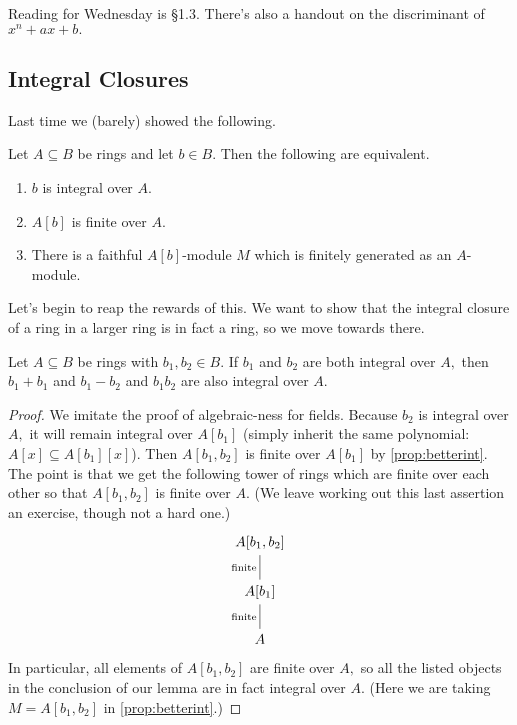\documentclass[../notes.tex]{subfiles}
\begin{document}
Reading for Wednesday is \S1.3. There's also a handout on the discriminant of $x^n+ax+b.$

\subsection{Integral Closures}
Last time we (barely) showed the following.
\begin{prop} \label{prop:betterint}
    Let $A\subseteq B$ be rings and let $b\in B.$ Then the following are equivalent.
    \begin{enumerate}[label=(\alph*)]
        \item $b$ is integral over $A.$
        \item $A[b]$ is finite over $A.$
        \item There is a faithful $A[b]$-module $M$ which is finitely generated as an $A$-module.
    \end{enumerate}
\end{prop}
Let's begin to reap the rewards of this. We want to show that the integral closure of a ring in a larger ring is in fact a ring, so we move towards there.
\begin{lem}
    Let $A\subseteq B$ be rings with $b_1,b_2\in B.$ If $b_1$ and $b_2$ are both integral over $A,$ then $b_1+b_1$ and $b_1-b_2$ and $b_1b_2$ are also integral over $A.$
\end{lem}
\begin{proof}
    We imitate the proof of algebraic-ness for fields. Because $b_2$ is integral over $A,$ it will remain integral over $A[b_1]$ (simply inherit the same polynomial: $A[x]\subseteq A[b_1][x]$). Then $A[b_1,b_2]$ is finite over $A[b_1]$ by \autoref{prop:betterint}. The point is that we get the following tower of rings which are finite over each other so that $A[b_1,b_2]$ is finite over $A.$ (We leave working out this last assertion an exercise, though not a hard one.)
    \[\begin{tikzcd}
    	{A[b_1,b_2]} \\
    	{A[b_1]} \\
    	A
    	\arrow["{\text{finite}}", no head, from=3-1, to=2-1]
    	\arrow["{\text{finite}}", no head, from=2-1, to=1-1]
    \end{tikzcd}\]
    In particular, all elements of $A[b_1,b_2]$ are finite over $A,$ so all the listed objects in the conclusion of our lemma are in fact integral over $A.$ (Here we are taking $M=A[b_1,b_2]$ in \autoref{prop:betterint}.)
\end{proof}
\end{document}
